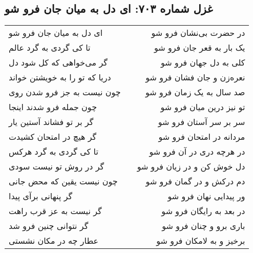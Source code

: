 \begin{center}
\section*{غزل شماره ۷۰۳: ای دل به میان جان فرو شو}
\label{sec:703}
\begin{longtable}{l p{0.5cm} r}
ای دل به میان جان فرو شو
&&
در حضرت بی‌نشان فرو شو
\\
تا کی گردی به گرد عالم
&&
یک بار به قعر جان فرو شو
\\
گر می‌خواهی که کل شود دل
&&
کلی به دل جهان فرو شو
\\
دریا که تو را به خویشتن خواند
&&
نعره‌زن و جان فشان فرو شو
\\
چون نیست به جز فرو شدن روی
&&
صد سال به یک زمان فرو شو
\\
چون جمله فرو شدند اینجا
&&
تو نیز درین میان فرو شو
\\
گر بر تو فشاند آستین یار
&&
سر بر سر آستان فرو شو
\\
گر هیچ در امتحان کشیدت
&&
مردانه در امتحان فرو شو
\\
تا کی گردی به گرد هرکس
&&
در هرچه دری در آن فرو شو
\\
گر در روش تو نیست سودی
&&
دل خوش کن و در زیان فرو شو
\\
چون نیست یقین که محض جانی
&&
دم درکش و در گمان فرو شو
\\
گر پنهانی برآی پیدا
&&
ور پیدایی نهان فرو شو
\\
گر نیست به عز قرب راهت
&&
در بعد به رایگان فرو شو
\\
گر نتوانی چنین فرو شد
&&
باری برو و چنان فرو شو
\\
عطار چه در مکان نشستی
&&
برخیز و به لامکان فرو شو
\\
\end{longtable}
\end{center}
